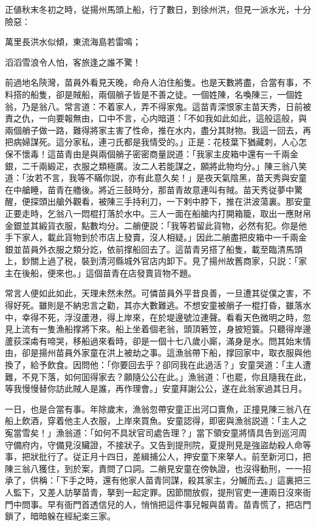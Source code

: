 正値秋末冬初之時，従揚州馬頭上船，行了數日，到徐州洪，但見一派水光，十分險惡：

\begin{myquote}
萬里長洪水似傾，東流海島若雷鳴；

滔滔雪浪令人怕，客旅逢之誰不驚！
\end{myquote}

前過地名陝灣，苗員外看見天晚，命舟人泊住船隻。也是天數將盡，合當有事，不料搭的船隻，卻是賊船，兩個艄子皆是不善之徒。一個姓陳，名喚陳三，一個姓翁，乃是翁八。常言道：不着家人，弄不得家鬼。這苗青深恨家主苗天秀，日前被責之仇，一向要報無由，口中不言，心内暗道：「不如我如此如此，這般這般，與兩個艄子做一路，難得將家主害了性命，推在水内，盡分其財物。我這一回去，再把病婦謀死。這分家私，連刁氏都是我情受的。」正是：花枝葉下猶藏刺，人心怎保不懷毒！這苗青由是與兩個艄子密密商量説道：「我家主皮箱中還有一千兩金銀，二千兩緞疋，衣服之類極廣。汝二人若能謀之，願將此物均分。」陳三翁八笑道：「汝若不言，我等不瞞你説，亦有此意久矣！」是夜天氣陰黑，苗天秀與安童在中艙睡，苗青在艪後。將近三鼓時分，那苗青故意連叫有賊。苗天秀従夢中驚醒，便探頭出艙外觀看，被陳三手持利刀，一下剌中脖下，推在洪波蕩裏。那安童正要走時，乞翁八一悶棍打落於水中。三人一面在船艙内打開箱籠，取出一應財帛金銀並其緞貨衣服，點數均分。二艄便説：「我等若留此貨物，必然有犯。你是他手下家人，載此貨物到於市店上發賣，沒人相疑。」因此二艄盡把皮箱中一千兩金銀並苗員外衣服之類分訖，依前撑船回去了。這苗青另搭了船隻，載至臨清馬頭上，鈔關上過了税，裝到清河縣城外官店内卸下。見了揚州故舊商家，只説：「家主在後船，便來也。」這個苗青在店發賣貨物不題。

常言人便如此如此，天理未然未然。可憐苗員外平昔良善，一旦遭其従僕之害，不得好死。雖則是不納忠言之勸，其亦大數難逃。不想安童被艄子一棍打昏，雖落水中，幸得不死，浮沒蘆港，得上岸來，在於堤邊號泣連聲。看看天色微明之時，忽見上流有一隻漁船撑將下來。船上坐着個老翁，頭頂箬笠，身披短簑。只聽得岸邊蘆荻深䖏有啼哭，移船過來看時，卻是一個十七八歲小廝，滿身是水。問其始末情由，卻是揚州苗員外家童在洪上被劫之事。這漁翁帶下船，撑回家中，取衣服與他換了，給予飲食。因問他：「你要回去乎？卻同我在此過活？」安童哭道：「主人遭難，不見下落，如何囬得家去？願隨公公在此。」漁翁道：「也罷，你且隨我在此，等我慢慢替你訪此賊人是誰，再作理會。」安童拜謝公公，遂在此翁家過其日月。

一日，也是合當有事。年除歲末，漁翁忽帶安童正出河口賣魚，正撞見陳三翁八在船上飲酒，穿着他主人衣服，上岸來買魚。安童認得，即密與漁翁説道：「主人之寃當雪矣！」漁翁道：「如何不具狀官司處告理？」當下領安童將情具告到巡河周守備府内，守備見沒贜證，不接狀子。又告到提刑院，夏提刑見是強盜劫殺人命等事，把狀批行了。従正月十四日，差緝捕公人，押安童下來拏人。前至新河口，把陳三翁八獲住，到於案，責問了口詞。二艄見安童在傍執證，也沒得動刑，一一招承了，供稱：「下手之時，還有他家人苗青同謀，殺其家主，分贓而去。」這裏把三人監下，又差人訪拏苗青，拏到一起定罪。因節間放假，提刑官吏一連兩日沒來衙門中問事。早有衙門首透信兒的人，悄悄把這件事兒報與苗青。苗青慌了，把店門鎖了，暗暗躲在經紀楽三家。

